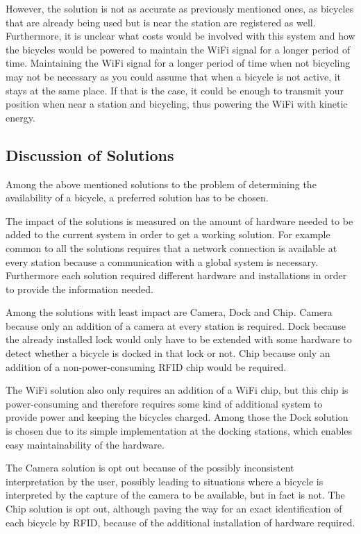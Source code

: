 However, the solution is not as accurate as previously mentioned ones, as bicycles that are already being used but is near the station are registered as well.
Furthermore, it is unclear what costs would be involved with this system and how the bicycles would be powered to maintain the WiFi signal for a longer period of time. 
Maintaining the WiFi signal for a longer period of time when not bicycling may not be necessary as you could assume that when a bicycle is not active, it stays at the same place.
If that is the case, it could be enough to transmit your position when near a station and bicycling, thus powering the WiFi with kinetic energy.

\subsection{Discussion of Solutions}
Among the above mentioned solutions to the problem of determining the availability of a bicycle, a preferred solution has to be chosen. 

The impact of the solutions is measured on the amount of hardware needed to be added to the current system in order to get a working solution. 
For example common to all the solutions requires that a network connection is available at every station because a communication with a global system is necessary. 
Furthermore each solution required different hardware and installations in order to provide the information needed. 

Among the solutions with least impact are Camera, Dock and Chip. 
Camera because only an addition of a camera at every station is required. 
Dock because the already installed lock would only have to be extended with some hardware to detect whether a bicycle is docked in that lock or not.
Chip because only an addition of a non-power-consuming RFID chip would be required.

The WiFi solution also only requires an addition of a WiFi chip, but this chip is power-consuming and therefore requires some kind of additional system to provide power and keeping the bicycles charged.
Among those the Dock solution is chosen due to its simple implementation at the docking stations, which enables easy maintainability of the hardware. 

The Camera solution is opt out because of the possibly inconsistent interpretation by the user, possibly leading to situations where a bicycle is interpreted by the capture of the camera to be available, but in fact is not. 
The Chip solution is opt out, although paving the way for an exact identification of each bicycle by RFID, because of the additional installation of hardware required.

